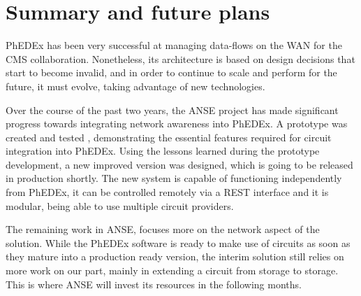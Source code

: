 \section{Summary and future plans}

PhEDEx has been very successful at managing data-flows on the WAN for the CMS 
collaboration. Nonetheless, its architecture is based on design decisions that 
start to become invalid, and in order to continue to scale and perform for the 
future, it must evolve, taking advantage of new technologies.

Over the course of the past two years, the ANSE project has made significant 
progress towards integrating network awareness into PhEDEx. A prototype was created and 
tested , demonstrating the essential features required for circuit integration 
into PhEDEx. Using the lessons learned during the prototype development, a new improved 
version was designed, which is going to be released in production shortly. 
The new system is capable of functioning independently from PhEDEx, it can be 
controlled remotely via a REST interface and it is modular, being able to use 
multiple circuit providers.

The remaining work in ANSE, focuses more on the network aspect of the solution.
While the PhEDEx software is ready to make use of circuits as soon as they mature 
into a production ready version, the interim solution still relies on more work 
on our part, mainly in extending a circuit from storage to storage. 
This is where ANSE will invest its resources in the following months.